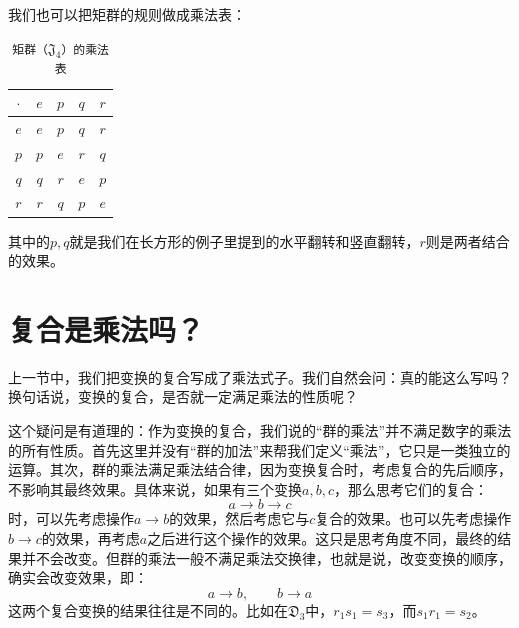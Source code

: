 \documentclass[12pt,UTF8,fontset=none]{ctexbook}
\begin{document}
我们也可以把矩群的规则做成乘法表：

\vspace{12pt}
\begin{table}[htbp]
    \centering
    \caption{\texttt{矩群（$\mathfrak{J}_4$）的乘法表}}
    \label{tab:K4_multiplication}
    \renewcommand{\arraystretch}{1.5} 
    \setlength{\tabcolsep}{12pt} 
    \begin{tabular}{|c|c!{\color{gray!50}\vrule}c!{\color{gray!50}\vrule}c!{\color{gray!50}\vrule}c|}
        \hline
        $\cdot$ & $e$ & $p$ & $q$ & $r$ \\
        \hline
        $e$     & $e$ & $p$ & $q$ & $r$ \\
        \hline
        $p$     & $p$ & $e$ & $r$ & $q$ \\
        \hline
        $q$     & $q$ & $r$ & $e$ & $p$ \\
        \hline
        $r$     & $r$ & $q$ & $p$ & $e$ \\
        \hline
    \end{tabular}
\end{table}

\vspace{12pt}
其中的$p,q$就是我们在长方形的例子里提到的水平翻转和竖直翻转，$r$则是两者结合的效果。

\section{复合是乘法吗？}

上一节中，我们把变换的复合写成了乘法式子。我们自然会问：真的能这么写吗？换句话说，变换的复合，是否就一定满足乘法的性质呢？

这个疑问是有道理的：作为变换的复合，我们说的“群的乘法”并不满足数字的乘法的所有性质。首先这里并没有“群的加法”来帮我们定义“乘法”，它只是一类独立的运算。其次，群的乘法满足乘法结合律，因为变换复合时，考虑复合的先后顺序，不影响其最终效果。具体来说，如果有三个变换$a,b,c$，那么思考它们的复合：
$$ a\rightarrow b\rightarrow c$$
时，可以先考虑操作$a\rightarrow b$的效果，然后考虑它与$c$复合的效果。也可以先考虑操作$b\rightarrow c$的效果，再考虑$a$之后进行这个操作的效果。这只是思考角度不同，最终的结果并不会改变。但群的乘法一般不满足乘法交换律，也就是说，改变变换的顺序，确实会改变效果，即：
$$ a\rightarrow b, \qquad b\rightarrow a$$
这两个复合变换的结果往往是不同的。比如在$\mathfrak{D}_3$中，$r_1s_1 = s_3$，而$s_1r_1 = s_2$。
\end{document}
